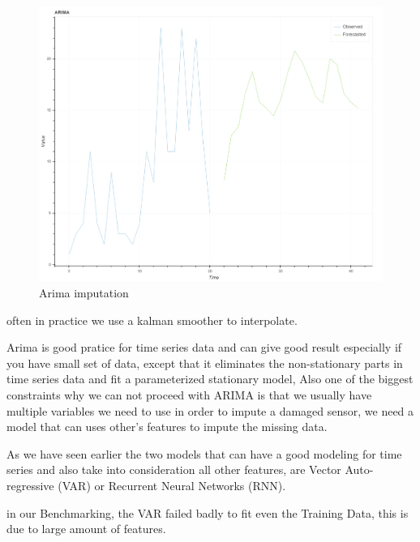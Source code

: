 \begin{figure}[H]
\centering
\includegraphics[scale=.2]{img/arima_imputation.png} 
\caption{Arima imputation}
\label{fig:arima_degree}
\end{figure}
often  in practice we use a kalman smoother to interpolate. 

Arima is good pratice for time series data and can give good result especially if you have small set of data, except that it eliminates the non-stationary parts in time series data and fit a parameterized stationary model, Also one of the biggest constraints why we can not proceed with ARIMA  is that we usually have multiple variables we need to use in order to impute  a damaged sensor, we need a model that can uses other's features to impute the missing data. 

As we have seen earlier the two models that can have a good modeling for time series and also  take into consideration all other features, are  Vector Auto-regressive (VAR) or Recurrent Neural Networks (RNN).

in  our Benchmarking, the VAR failed badly to fit even the Training Data, this is due to large amount of features. 

